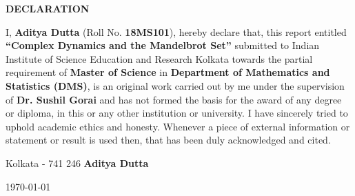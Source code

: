 \setcounter{page}{2}
\begin{center}
	{\Large{\textbf{DECLARATION}}}
\end{center}

\noindent

I, \textbf{Aditya Dutta} (Roll No. \textbf{18MS101}), hereby declare that, this report entitled \textbf{``Complex Dynamics and the Mandelbrot Set”} submitted to Indian Institute of Science Education and Research Kolkata towards the partial requirement of \textbf{Master of Science} in \textbf{Department of Mathematics and Statistics (DMS)}, is an original work carried out by me under the supervision of \textbf{Dr. Sushil Gorai} and has not formed the basis for the award of any degree or diploma, in this or any other institution or university. I have sincerely tried to uphold academic ethics and honesty. Whenever a piece of external information or statement or result is used then, that has been duly acknowledged and cited.

\vspace{4cm} %

\noindent Kolkata - 741 246 \hfill \textbf{Aditya Dutta}

\noindent \today \hfill

\clearpage
